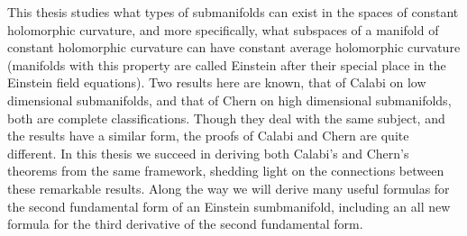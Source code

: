 \documentclass[11pt]{amsart}
\theoremstyle{definition}
\theoremstyle{definition}
\begin{document}
This thesis studies what types of submanifolds can exist in the spaces of constant holomorphic curvature, and more specifically, what subspaces of a manifold of constant holomorphic curvature can have constant average holomorphic curvature (manifolds with this property are called Einstein after their special place in the Einstein field equations).  Two results here are known, that of Calabi on low dimensional submanifolds, and that of Chern on high dimensional submanifolds, both are complete classifications.  Though they deal with the same subject, and the results have a similar form, the proofs of Calabi and Chern are quite different.  In this thesis we succeed in deriving both Calabi's and Chern's theorems from the same framework, shedding light on the connections between these remarkable results.  Along the way we will derive many useful formulas for the second fundamental form of an Einstein sumbmanifold, including an all new formula for the third derivative of the second fundamental form.
\end{document}
